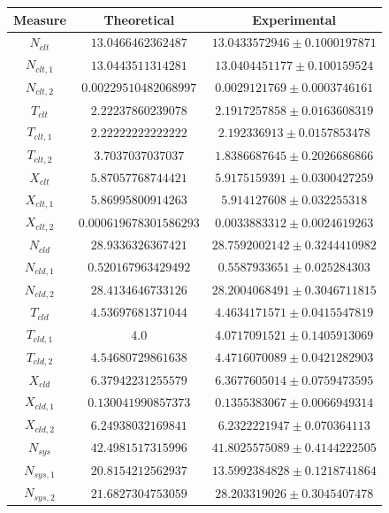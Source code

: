\begin{figure}
	\begin{center}
		\begin{tabular}{|c||c|c|}
\hline
Measure & Theoretical & Experimental \\
\hline
$N_{clt}$  & $13.0466462362487$ & $13.0433572946\pm 0.1000197871$ \\ 
$N_{clt,1}$  & $13.0443511314281$ & $13.0404451177\pm 0.100159524$ \\ 
$N_{clt,2}$  & $0.00229510482068997$ & $0.0029121769\pm 0.0003746161$ \\ 
$T_{clt}$  & $2.22237860239078$ & $2.1917257858\pm 0.0163608319$ \\ 
$T_{clt,1}$  & $2.22222222222222$ & $2.192336913\pm 0.0157853478$ \\ 
$T_{clt,2}$  & $3.7037037037037$ & $1.8386687645\pm 0.2026686866$ \\ 
$X_{clt}$  & $5.87057768744421$ & $5.9175159391\pm 0.0300427259$ \\ 
$X_{clt,1}$  & $5.86995800914263$ & $5.914127608\pm 0.032255318$ \\ 
$X_{clt,2}$  & $0.000619678301586293$ & $0.0033883312\pm 0.0024619263$ \\ 
\hline 
$N_{cld}$  & $28.9336326367421$ & $28.7592002142\pm 0.3244410982$ \\ 
$N_{cld,1}$  & $0.520167963429492$ & $0.5587933651\pm 0.025284303$ \\ 
$N_{cld,2}$  & $28.4134646733126$ & $28.2004068491\pm 0.3046711815$ \\ 
$T_{cld}$  & $4.53697681371044$ & $4.4634171571\pm 0.0415547819$ \\ 
$T_{cld,1}$  & $4.0$ & $4.0717091521\pm 0.1405913069$ \\ 
$T_{cld,2}$  & $4.54680729861638$ & $4.4716070089\pm 0.0421282903$ \\ 
$X_{cld}$  & $6.37942231255579$ & $6.3677605014\pm 0.0759473595$ \\ 
$X_{cld,1}$  & $0.130041990857373$ & $0.1355383067\pm 0.0066949314$ \\ 
$X_{cld,2}$  & $6.24938032169841$ & $6.2322221947\pm 0.070364113$ \\ 
\hline 
$N_{sys}$  & $42.4981517315996$ & $41.8025575089\pm 0.4144222505$ \\ 
$N_{sys,1}$  & $20.8154212562937$ & $13.5992384828\pm 0.1218741864$ \\ 
$N_{sys,2}$  & $21.6827304753059$ & $28.203319026\pm 0.3045407478$ \\ 

\end{tabular}
\end{center}
\end{figure}

